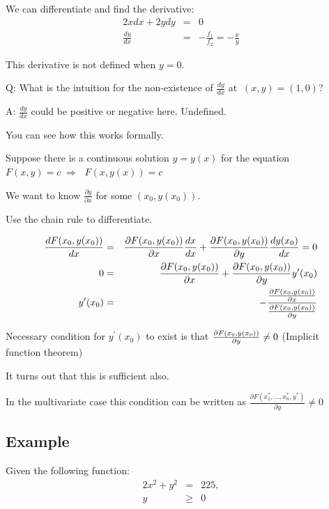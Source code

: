 \documentclass[11pt,english]{article}
\begin{document}
We can differentiate and find the derivative: 
\begin{eqnarray*}
2xdx+2ydy &=&0 \\
\frac{dy}{dx} &=&-\frac{f_{1}}{f_{2}}=-\frac{x}{y}
\end{eqnarray*}

This derivative is not defined when $y=0$.

\bigskip

Q: What is the intuition for the non-existence of $\frac{dy}{dx}$ at $\
(x,y)=(1,0)$?

A: $\frac{dy}{dx}$ could be positive or negative here. Undefined.

You can see how this works formally.

Suppose there is a continuous solution $y=y(x)$ for the equation $%
F(x,y)=c\;\Rightarrow \;$ $F(x,y(x))=c$

We want to know $\frac{\partial y}{\partial x}$ for some $(x_{0},y(x_{0}))$.

Use the chain rule to differentiate.

\begin{eqnarray*}
\frac{dF(x_{0},y(x_{0}))}{dx} &=&\frac{\partial F(x_{0},y(x_{0}))}{\partial x%
}\frac{dx}{dx}+\frac{\partial F(x_{0},y(x_{0}))}{\partial y}\frac{dy(x_{0})}{%
dx}=0 \\
0 &=&\frac{\partial F(x_{0},y(x_{0}))}{\partial x}+\frac{\partial
F(x_{0},y(x_{0}))}{\partial y}y^{\prime }(x_{0}) \\
y^{\prime }(x_{0}) &=&-\frac{\frac{\partial F(x_{0},y(x_{0}))}{\partial x}}{%
\frac{\partial F(x_{0},y(x_{0}))}{\partial y}}
\end{eqnarray*}

Necessary condition for $y^{\prime }(x_{0})$ to exist is that $\frac{%
\partial F(x_{0},y(x_{0}))}{\partial y}\neq 0$ (Implicit function theorem)

It turns out that this is sufficient also.

In the multivariate case this condition can be written as $\frac{\partial
F(x_{1}^{\ast },...,x_{n}^{\ast },y^{\ast })}{\partial y}\neq 0$

\subsection{Example}

Given the following function: 
\begin{eqnarray*}
2x^{2}+y^{2} &=&225, \\
y &\geq &0
\end{eqnarray*}
\end{document}
